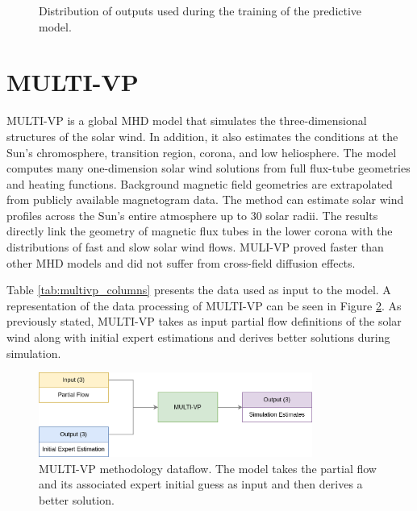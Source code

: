 \begin{figure}[!ht]
\begin{subfigure}[b]{0.32\textwidth}
     \end{subfigure}
     \hfill
        \caption{Distribution of outputs used during the training of the predictive model.}
        \label{fig:output_distrib_bp}
\end{figure}


\section{MULTI-VP}\label{sec:multivp}

MULTI-VP \cite{pinto.rouillard_MultipleFluxtubeSolar_2017} is a global MHD model that simulates the three-dimensional structures of the solar wind. In addition, it also estimates the conditions at the Sun's chromosphere, transition region, corona, and low heliosphere. The model computes many one-dimension solar wind solutions from full flux-tube geometries and heating functions. Background magnetic field geometries are extrapolated from publicly available magnetogram data. The method can estimate solar wind profiles across the Sun's entire atmosphere up to 30 solar radii. The results directly link the geometry of magnetic flux tubes in the lower corona with the distributions of fast and slow solar wind flows. MULI-VP proved faster than other MHD models and did not suffer from cross-field diffusion effects.

Table \ref{tab:multivp_columns} presents the data used as input to the model. A representation of the data processing of MULTI-VP can be seen in Figure \ref{fig:multivp_method}. As previously stated, MULTI-VP takes as input partial flow definitions of the solar wind along with initial expert estimations and derives better solutions during simulation.

\vspace{0.5cm}
\begin{figure}[!h]
\centering
\includegraphics[width=0.8\textwidth]{figures/multivp_method.png}
\caption[MULTI-VP methodology dataflow]{MULTI-VP methodology dataflow. The model takes the partial flow and its associated expert initial guess as input and then derives a better solution.\label{fig:multivp_method}}
\end{figure}


